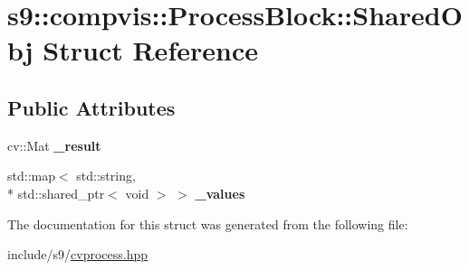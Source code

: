 \hypertarget{structs9_1_1compvis_1_1ProcessBlock_1_1SharedObj}{\section{s9\-:\-:compvis\-:\-:Process\-Block\-:\-:Shared\-Obj Struct Reference}
\label{structs9_1_1compvis_1_1ProcessBlock_1_1SharedObj}
}
\subsection*{Public Attributes}
\begin{DoxyCompactItemize}
\item 
\hypertarget{structs9_1_1compvis_1_1ProcessBlock_1_1SharedObj_aee9aef39ed555070c195ea8cdaa10e6e}{cv\-::\-Mat {\bfseries \-\_\-result}}\label{structs9_1_1compvis_1_1ProcessBlock_1_1SharedObj_aee9aef39ed555070c195ea8cdaa10e6e}

\item 
\hypertarget{structs9_1_1compvis_1_1ProcessBlock_1_1SharedObj_a7219cae77fd4bcc82c185fc49947a0eb}{std\-::map$<$ std\-::string, \\*
std\-::shared\-\_\-ptr$<$ void $>$ $>$ {\bfseries \-\_\-values}}\label{structs9_1_1compvis_1_1ProcessBlock_1_1SharedObj_a7219cae77fd4bcc82c185fc49947a0eb}

\end{DoxyCompactItemize}


The documentation for this struct was generated from the following file\-:\begin{DoxyCompactItemize}
\item 
include/s9/\hyperlink{cvprocess_8hpp}{cvprocess.\-hpp}\end{DoxyCompactItemize}
